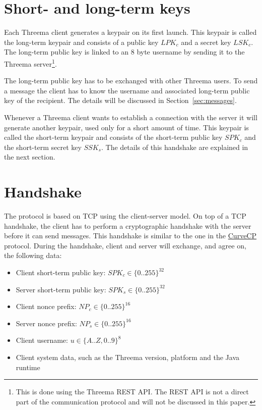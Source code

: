\documentclass[11pt,a4paper,bookmarksopen=true]{article}
\begin{document}
\section{Short- and long-term keys}\label{sec:keys}

Each Threema client generates a keypair on its first launch. This
keypair is called the long-term keypair and consists of a public key
$\mathit{LPK}_c$ and a secret key $\mathit{LSK}_c$. The
long-term public key is linked to an 8 byte username by sending it to the
Threema server\footnote{This is done using the Threema REST API. The REST
  API is not a direct part of the communication protocol and will not
  be discussed in this paper.}.

The long-term public key has to be exchanged with other Threema
users. To send a message the client has to know the username and
associated long-term public key of the recipient. The details will be
discussed in Section~\ref{sec:messages}.

Whenever a Threema client wants to establish a connection with the
server it will generate another keypair, used only for a short amount of
time. This keypair is called the short-term keypair and consists of
the short-term public key $\mathit{SPK}_c$ and the short-term secret
key $\mathit{SSK}_s$. The details of this handshake are explained in
the next section.

\section{Handshake}\label{sec:handshake}

The protocol is based on TCP using the client-server model.  On top of a
TCP handshake, the client has to perform a cryptographic handshake with the
server before it can send messages. This handshake is similar to the
one in the \href{http://curvecp.org/index.html}{CurveCP}
protocol.  During the handshake, client and server will exchange, and
agree on, the following data:

\begin{itemize}
  \item Client short-term public key: $\mathit{SPK}_c \in \{0..255\}^{32}$
  \item Server short-term public key: $\mathit{SPK}_s \in \{0..255\}^{32}$
  \item Client nonce prefix: $\mathit{NP}_c \in \{0..255\}^{16}$
  \item Server nonce prefix: $\mathit{NP}_s \in \{0..255\}^{16}$
  \item Client username: $u \in \{A ..Z, 0 ..9\}^8$
  \item Client system data, such as the Threema version, platform and the Java runtime
\end{itemize}
\end{document}
